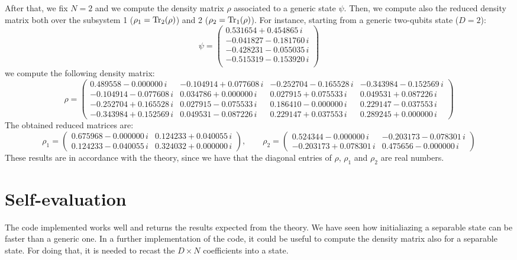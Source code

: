 \documentclass[rmp,10pt,onecolumn,fleqn,notitlepage]{revtex4-1}
\begin{document}
After that, we fix \( N=2 \) and we compute the density matrix \( \rho  \) associated to a generic state \( \psi  \). Then, we compute also the reduced density matrix both over the subsystem 1 (\( \rho _1 = \Tr_2 (\rho )  \)) and 2 (\( \rho _2 = \Tr_1 (\rho )  \)).
For instance, starting from a generic two-qubits state (\( D=2 \)):
\begin{equation*}
    \psi =
  \begin{pmatrix}
       0.531654 +0.454865\,i \\
      -0.041827 -0.181760\,i \\
      -0.428231 -0.055035\,i \\
      -0.515319 -0.153920\,i \\
  \end{pmatrix}
\end{equation*}
we compute the following density matrix:
\begin{equation*}
    \rho =
  \begin{pmatrix}
       0.489558 -0.000000\,i & -0.104914 +0.077608\, i & -0.252704 -0.165528\, i & -0.343984 -0.152569\, i \\
      -0.104914 -0.077608\,i &  0.034786 +0.000000\,i &  0.027915 +0.075533\,i &  0.049531 +0.087226\,i \\
      -0.252704 +0.165528\,i &  0.027915 -0.075533\,i &  0.186410 -0.000000\,i &  0.229147 -0.037553\,i \\
      -0.343984 +0.152569\,i &  0.049531 -0.087226\,i &  0.229147 +0.037553\,i &  0.289245 +0.000000\,i
  \end{pmatrix}
\end{equation*}
The obtained reduced matrices are:
\begin{equation*}
    \rho _1 =
  \begin{pmatrix}
    0.675968 -0.000000\,i & 0.124233 +0.040055\,i \\
    0.124233 -0.040055\,i & 0.324032 +0.000000\,i
  \end{pmatrix},
  \qquad \rho_2 =
  \begin{pmatrix}
     0.524344 -0.000000\,i & -0.203173 -0.078301\,i \\
    -0.203173 +0.078301\,i &  0.475656 -0.000000\,i
  \end{pmatrix}
\end{equation*}
These results are in accordance with the theory, since we have that the diagonal entries of \( \rho  \), \( \rho _1 \) and \( \rho _2 \) are real numbers.



\section{Self-evaluation}
The code implemented works well and returns the results expected from the theory. We have seen how initialiazing a separable state can be faster than a generic one.
In a further implementation of the code, it could be useful to compute the density matrix also for a separable state. For doing that, it is needed to recast the \( D\times N \) coefficients into a state.
\end{document}
